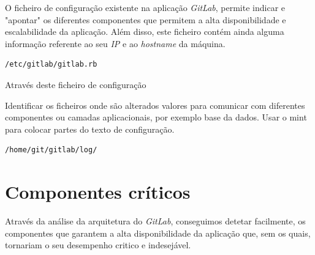 \documentclass[12pt,a4paper]{article}
\begin{document}
O ficheiro de configuração existente na aplicação \emph{GitLab}, permite indicar e "apontar" os diferentes componentes que permitem a alta disponibilidade e escalabilidade da aplicação. Além disso, este ficheiro contém ainda alguma informação referente ao seu \emph{IP} e ao \emph{hostname} da máquina.

\begin{verbatim}
/etc/gitlab/gitlab.rb
\end{verbatim}

Através deste ficheiro de configuração 

Identificar os ficheiros onde são alterados valores para comunicar com diferentes componentes ou camadas aplicacionais, por exemplo base da dados.
Usar o mint para colocar partes do texto de configuração.

\begin{verbatim}
/home/git/gitlab/log/
\end{verbatim}








\newpage
\section{Componentes críticos}

Através da análise da arquitetura do \emph{GitLab}, conseguimos detetar facilmente, os componentes que garantem a alta disponibilidade da aplicação que, sem os quais, tornariam o seu desempenho critico e indesejável.
\end{document}
